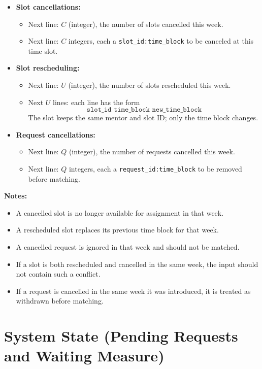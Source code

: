 \documentclass[12pt]{article}
\begin{document}
\begin{itemize}
    \item \textbf{Slot cancellations:}
    \begin{itemize}
        \item Next line: $C$ (integer), the number of slots cancelled this week.
        \item Next line: $C$ integers, each a \texttt{slot\_id:time\_block} to be canceled at this time slot.
    \end{itemize}

    \item \textbf{Slot rescheduling:}
    \begin{itemize}
        \item Next line: $U$ (integer), the number of slots rescheduled this week.
        \item Next $U$ lines: each line has the form
        \[
        \texttt{slot\_id time\_block new\_time\_block}
        \]
        The slot keeps the same mentor and slot ID; only the time block changes.
    \end{itemize}

    \item \textbf{Request cancellations:}
    \begin{itemize}
        \item Next line: $Q$ (integer), the number of requests cancelled this week.
        \item Next line: $Q$ integers, each a \texttt{request\_id:time\_block} to be removed before matching.
    \end{itemize}
\end{itemize}

\bigskip
\noindent\textbf{Notes:}
\begin{itemize}
    \item A cancelled slot is no longer available for assignment in that week.
    \item A rescheduled slot replaces its previous time block for that week.
    \item A cancelled request is ignored in that week and should not be matched.
    \item If a slot is both rescheduled and cancelled in the same week, the input should not contain such a conflict.
    \item If a request is cancelled in the same week it was introduced, it is treated as withdrawn before matching.
\end{itemize}


\section*{System State (Pending Requests and Waiting Measure)}
\end{document}

